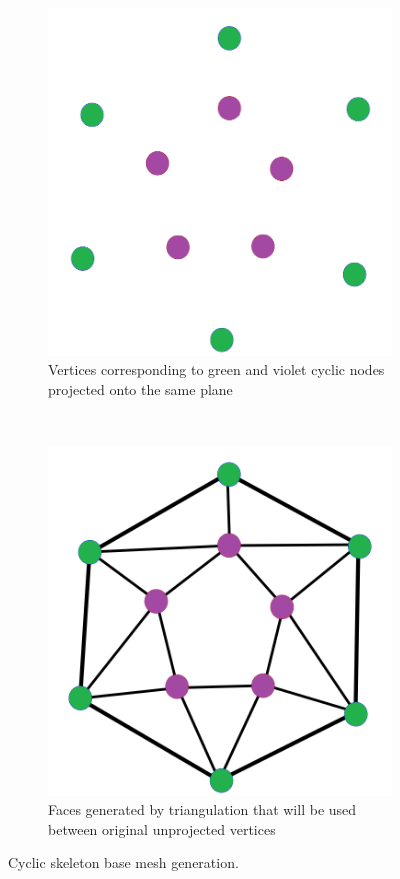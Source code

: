 \begin{figure}[ht]
\begin{subfigure}[b]{0.4\linewidth}
        \end{subfigure}
        \\ %
        \begin{subfigure}[b]{0.4\linewidth}
        \centering
			\includegraphics[width=0.8\linewidth]{images/del_tria_1}
            \caption{Vertices corresponding to green and violet cyclic nodes projected onto the same plane}
            \label{fig:cycle_del_before}
        \end{subfigure}
        ~ %
        \begin{subfigure}[b]{0.4\linewidth}
        \centering
			\includegraphics[width=0.8\linewidth]{images/del_tria_2}
            \caption{Faces generated by triangulation that will be used between original unprojected vertices}
            \label{fig:cycle_del_after}
        \end{subfigure}
        \caption{Cyclic skeleton base mesh generation.}
        \label{fig:cycle_ilu}
\end{figure}